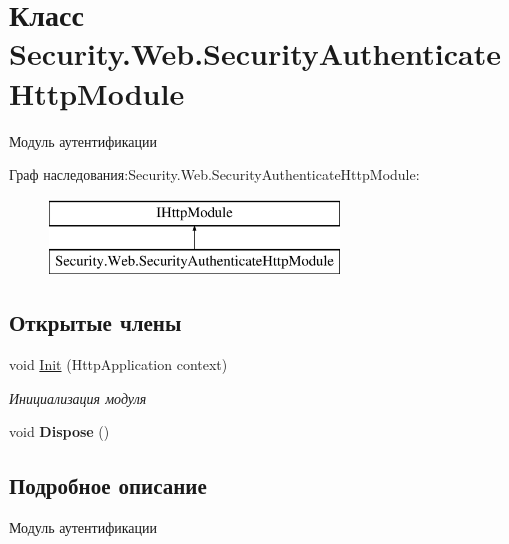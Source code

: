 \hypertarget{class_security_1_1_web_1_1_security_authenticate_http_module}{}\section{Класс Security.\+Web.\+Security\+Authenticate\+Http\+Module}
\label{class_security_1_1_web_1_1_security_authenticate_http_module}


Модуль аутентификации  


Граф наследования\+:Security.\+Web.\+Security\+Authenticate\+Http\+Module\+:\begin{figure}[H]
\begin{center}
\leavevmode
\includegraphics[height=2.000000cm]{d7/d83/class_security_1_1_web_1_1_security_authenticate_http_module}
\end{center}
\end{figure}
\subsection*{Открытые члены}
\begin{DoxyCompactItemize}
\item 
void \hyperlink{class_security_1_1_web_1_1_security_authenticate_http_module_a7b068323235390535339e55136e658ec}{Init} (Http\+Application context)
\begin{DoxyCompactList}\small\item\em Инициализация модуля \end{DoxyCompactList}\item 
\mbox{\label{class_security_1_1_web_1_1_security_authenticate_http_module_ae2c24a499cadddf78521a07180e3f618}} 
void {\bfseries Dispose} ()
\end{DoxyCompactItemize}


\subsection{Подробное описание}
Модуль аутентификации 



